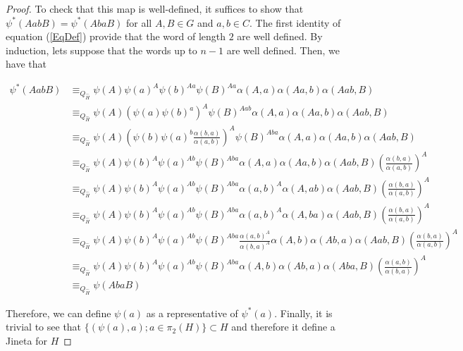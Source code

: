 \documentclass[10pt,a4paper]{amsart}
\begin{document}
\begin{proof}
    To check that this map is well-defined, it suffices to show that $\psi^*(AabB) = \psi^*(AbaB)$ for all $A, B \in G$ and $a, b \in C$. The first identity of equation (\ref{EqDef}) provide that the word of length $2$ are well defined. By induction, lets suppose that the words up to $n-1$ are well defined. Then, we have that
    
    \begin{align*}
        \psi^*(AabB) & \equiv_{Q_{\hat{H}}} \psi(A)\psi(a)^A \psi(b)^{Aa} \psi(B)^{Aa} \alpha(A,a)\alpha(Aa,b)\alpha(Aab,B) \\ 
        & \equiv_{Q_{\hat{H}}} \psi(A) \left(\psi(a) \psi(b)^{a}\right)^{A} \psi(B)^{Aab} \alpha(A,a)\alpha(Aa,b)\alpha(Aab,B) \\ 
        & \equiv_{Q_{\hat{H}}} \psi(A) \left(\psi(b) \psi(a)^{b} \frac{\alpha(b,a)}{\alpha(a,b)}\right)^{A} \psi(B)^{Aba} \alpha(A,a)\alpha(Aa,b)\alpha(Aab,B) \\ 
        & \equiv_{Q_{\hat{H}}} \psi(A) \psi(b)^A \psi(a)^{Ab}  \psi(B)^{Aba} \alpha(A,a)\alpha(Aa,b)\alpha(Aab,B) \left(\frac{\alpha(b,a)}{\alpha(a,b)}\right)^{A} \\ 
        & \equiv_{Q_{\hat{H}}} \psi(A) \psi(b)^A \psi(a)^{Ab}  \psi(B)^{Aba} \alpha(a,b)^A\alpha(A,ab)\alpha(Aab,B) \left(\frac{\alpha(b,a)}{\alpha(a,b)}\right)^{A}\\
        & \equiv_{Q_{\hat{H}}} \psi(A) \psi(b)^A \psi(a)^{Ab}  \psi(B)^{Aba} \alpha(a,b)^A\alpha(A,ba)\alpha(Aab,B)\left(\frac{\alpha(b,a)}{\alpha(a,b)}\right)^{A} \\ 
        & \equiv_{Q_{\hat{H}}} \psi(A) \psi(b)^A \psi(a)^{Ab}  \psi(B)^{Aba} \frac{\alpha(a,b)^A}{\alpha(b,a)^A}\alpha(A,b) \alpha(Ab,a)\alpha(Aab,B) \left(\frac{\alpha(b,a)}{\alpha(a,b)}\right)^{A}\\ 
        & \equiv_{Q_{\hat{H}}} \psi(A) \psi(b)^A \psi(a)^{Ab}  \psi(B)^{Aba} \alpha(A,b)\alpha(Ab,a)\alpha(Aba,B) \left(\frac{\alpha(a,b)}{\alpha(b,a)}\right)^{A} \\ 
        & \equiv_{Q_{\hat{H}}} \psi(AbaB)
    \end{align*}

    Therefore, we can define $\psi(a)$ as a representative of $\psi^*(a)$. Finally, it is trivial to see that $\{(\psi(a),a) ; a \in \pi_2(H)\} \subset H$ and therefore it define a Jineta for $H$
\end{proof}
\end{document}
